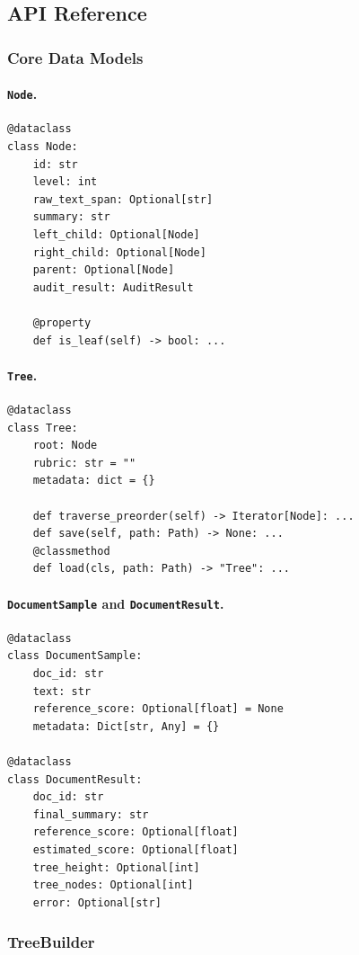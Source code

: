 \subsection{API Reference}

\subsubsection{Core Data Models}

\paragraph{\texttt{Node}.}
\begin{lstlisting}
@dataclass
class Node:
    id: str
    level: int
    raw_text_span: Optional[str]
    summary: str
    left_child: Optional[Node]
    right_child: Optional[Node]
    parent: Optional[Node]
    audit_result: AuditResult

    @property
    def is_leaf(self) -> bool: ...
\end{lstlisting}

\paragraph{\texttt{Tree}.}
\begin{lstlisting}
@dataclass
class Tree:
    root: Node
    rubric: str = ""
    metadata: dict = {}

    def traverse_preorder(self) -> Iterator[Node]: ...
    def save(self, path: Path) -> None: ...
    @classmethod
    def load(cls, path: Path) -> "Tree": ...
\end{lstlisting}

\paragraph{\texttt{DocumentSample} and \texttt{DocumentResult}.}
\begin{lstlisting}
@dataclass
class DocumentSample:
    doc_id: str
    text: str
    reference_score: Optional[float] = None
    metadata: Dict[str, Any] = {}

@dataclass
class DocumentResult:
    doc_id: str
    final_summary: str
    reference_score: Optional[float]
    estimated_score: Optional[float]
    tree_height: Optional[int]
    tree_nodes: Optional[int]
    error: Optional[str]
\end{lstlisting}

\subsubsection{TreeBuilder}

